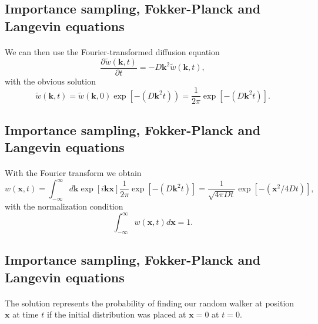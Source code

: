 \documentclass[%
twoside,                 %
final,                   %
10pt]{article}
\begin{document}
\subsection*{Importance sampling, Fokker-Planck and Langevin equations}

\paragraph{}
We can then use the Fourier-transformed diffusion equation 
\[
    \frac{\partial \tilde{w}(\mathbf{k},t)}{\partial t} = -D\mathbf{k}^2\tilde{w}(\mathbf{k},t),
\]
with the obvious solution
\[
   \tilde{w}(\mathbf{k},t)=\tilde{w}(\mathbf{k},0)\exp{\left[-(D\mathbf{k}^2t)\right)}=
    \frac{1}{2\pi}\exp{\left[-(D\mathbf{k}^2t)\right]}. 
\]




\subsection*{Importance sampling, Fokker-Planck and Langevin equations}

\paragraph{}
With the Fourier transform we obtain 
\[
   w(\mathbf{x},t)=\int_{-\infty}^{\infty}d\mathbf{k} \exp{\left[i\mathbf{kx}\right]}\frac{1}{2\pi}\exp{\left[-(D\mathbf{k}^2t)\right]}=
    \frac{1}{\sqrt{4\pi Dt}}\exp{\left[-(\mathbf{x}^2/4Dt)\right]}, 
\]
with the normalization condition
\[
   \int_{-\infty}^{\infty}w(\mathbf{x},t)d\mathbf{x}=1.
\]





\subsection*{Importance sampling, Fokker-Planck and Langevin equations}

\paragraph{}
The solution represents the probability of finding
our random walker at position $\mathbf{x}$ at time $t$ if the initial distribution 
was placed at $\mathbf{x}=0$ at $t=0$. 
\end{document}
